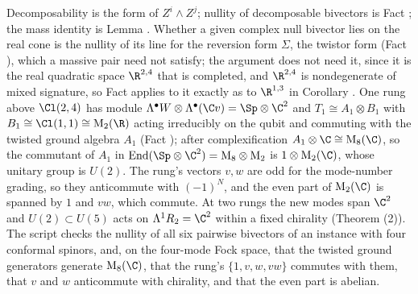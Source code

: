 Decomposability is the form of $Z^{i} \wedge Z^{j}$; nullity of decomposable bivectors is Fact ; the mass identity is Lemma . Whether a given complex null bivector lies on the real cone is the nullity of its line for the reversion form $\Sigma$, the twistor form (Fact ), which a massive pair need not satisfy; the argument does not need it, since it is the real quadratic space $\R^{2,4}$ that is completed, and $\R^{2,4}$ is nondegenerate of mixed signature, so Fact  applies to it exactly as to $\R^{1,3}$ in Corollary . One rung above $\Cl(2,4)$ has module $\Lambda^{\bullet}W \otimes \Lambda^{\bullet}(\C v) = \Sp \otimes \C^{2}$ and $T_{1} \cong A_{1} \otimes B_{1}$ with $B_{1} \cong \Cl(1,1) \cong \mathrm{M}_{2}(\R)$ acting irreducibly on the qubit and commuting with the twisted ground algebra $A_{1}$ (Fact ); after complexification $A_{1} \otimes \C \cong \mathrm{M}_{8}(\C)$, so the commutant of $A_{1}$ in $\mathrm{End}(\Sp \otimes \C^{2}) = \mathrm{M}_{8} \otimes \mathrm{M}_{2}$ is $1 \otimes \mathrm{M}_{2}(\C)$, whose unitary group is $U(2)$. The rung's vectors $v, w$ are odd for the mode-number grading, so they anticommute with $(-1)^{N}$, and the even part of $\mathrm{M}_{2}(\C)$ is spanned by $1$ and $vw$, which commute. At two rungs the new modes span $\C^{2}$ and $U(2) \subset U(5)$ acts on $\Lambda^{1}R_{2} = \C^{2}$ within a fixed chirality (Theorem (2)). The script checks the nullity of all six pairwise bivectors of an instance with four conformal spinors, and, on the four-mode Fock space, that the twisted ground generators generate $\mathrm{M}_{8}(\C)$, that the rung's $\{1, v, w, vw\}$ commutes with them, that $v$ and $w$ anticommute with chirality, and that the even part is abelian.

